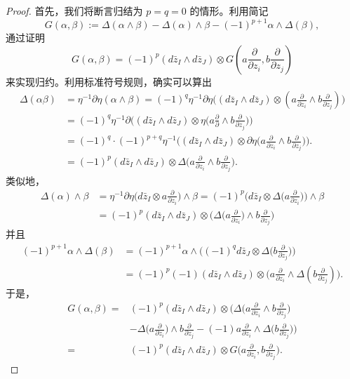 \begin{proof}
    首先，我们将断言归结为 $p=q=0$ 的情形。利用简记\[
        G(\alpha,\beta):=\varDelta(\alpha\wedge\beta)-\varDelta(\alpha)\wedge\beta-{(-1)}^{p+1}\alpha\wedge\varDelta(\beta),
    \]通过证明\[
        G(\alpha,\beta)=(-1)^p (d\bar{z}_I \wedge d\bar{z}_J)\otimes G(a\frac{\partial}{\partial z_i},b\frac{\partial}{\partial z_j})
    \]来实现归约。利用标准符号规则，确实可以算出\begin{align*}
        \varDelta(\alpha\beta)&=\eta^{-1}\partial\eta(\alpha\wedge\beta)=(-1)^q \eta^{-1}\partial\eta\bigg((d\bar{z}_I \wedge d\bar{z}_J)\otimes(a\frac{\partial}{\partial z_i}\wedge b\frac{\partial}{\partial z_j})\bigg)\\
        &=(-1)^q \eta^{-1}\partial\bigg((d\bar{z}_I \wedge d\bar{z}_J)\otimes \eta\bigg(a\frac{\partial}{\partial}\wedge b\frac{\partial}{\partial z_j}\bigg)\bigg)\\
        &=(-1)^q \cdot (-1)^{p+q} \eta^{-1}\bigg((d\bar{z}_I \wedge d\bar{z}_J)\otimes\partial\eta\bigg(a\frac{\partial}{\partial z_i}\wedge b\frac{\partial}{\partial z_j}\bigg)\bigg).\\
        &=(-1)^p (d\bar{z}_I \wedge d\bar{z}_J)\otimes\varDelta\bigg(a\frac{\partial}{\partial z_i}\wedge b\frac{\partial}{\partial z_j}\bigg).
    \end{align*}
    类似地，\begin{align*}
        \varDelta(\alpha)\wedge\beta&=\eta^{-1}\partial\eta\bigg(d\bar{z}_I \otimes a\frac{\partial}{\partial z_i}\bigg)\wedge\beta=(-1)^p \bigg(d\bar{z}_I \otimes \varDelta\bigg( a\frac{\partial}{\partial z_i}\bigg)\bigg)\wedge\beta\\
        &=(-1)^p (d\bar{z}_I \wedge d\bar{z}_J)\otimes \bigg(\varDelta \bigg(a\frac{\partial}{\partial z_i}\bigg)\wedge b\frac{\partial}{\partial z_j}\bigg)
    \end{align*}并且\begin{align*}
        (-1)^{p+1}\alpha\wedge\varDelta(\beta)&=(-1)^{p+1}\alpha\wedge\bigg((-1)^q d\bar{z}_J \otimes \varDelta\bigg(b\frac{\partial}{\partial z_j}\bigg)\bigg)\\
        &=(-1)^p (-1)(d\bar{z}_I \wedge d\bar{z}_J)\otimes \bigg(a\frac{\partial}{\partial  z_i}\wedge\varDelta(b\frac{\partial}{\partial z_j})\bigg).
    \end{align*}于是，\begin{align*}
        G(\alpha,\beta)=&(-1)^p (d\bar{z}_I \wedge d\bar{z}_J)\otimes \bigg(\varDelta\bigg(a\frac{\partial}{\partial z_i}\wedge b\frac{\partial}{\partial z_j}\bigg)\\ &-\varDelta\bigg(a\frac{\partial}{\partial z_i}\bigg)\wedge b\frac{\partial}{\partial z_j}-(-1)a\frac{\partial}{\partial z_i}\wedge\varDelta\bigg(b\frac{\partial}{\partial z_j}\bigg)\bigg)\\
        =&(-1)^p (d\bar{z}_I \wedge d\bar{z}_J)\otimes G\bigg(a\frac{\partial}{\partial z_i},b\frac{\partial}{\partial z_j}\bigg).
    \end{align*}


\end{proof}
